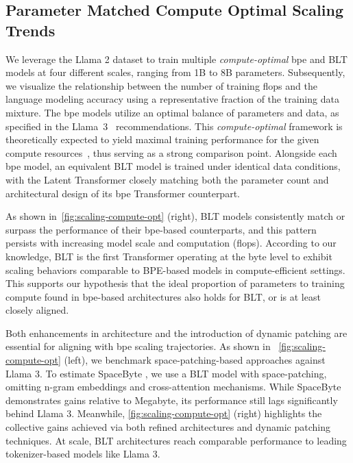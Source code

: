 \subsection{Parameter Matched Compute Optimal Scaling Trends}
\label{section:parameter-matched-scaling}
We leverage the Llama 2 dataset to train multiple \textit{compute-optimal} bpe and {\textsc BLT} models at four different scales, ranging from 1B to 8B parameters. Subsequently, we visualize the relationship between the number of training flops and the language modeling accuracy using a representative fraction of the training data mixture. The bpe models utilize an optimal balance of parameters and data, as specified in the Llama~3~\citep{dubey2024llama} recommendations. This \textit{compute-optimal} framework is theoretically expected to yield maximal training performance for the given compute resources~\citep{hoffmann2022training}, thus serving as a strong comparison point. Alongside each bpe model, an equivalent {\textsc BLT} model is trained under identical data conditions, with the Latent Transformer closely matching both the parameter count and architectural design of its bpe Transformer counterpart.

As shown in~\autoref{fig:scaling-compute-opt} (right), {\textsc BLT} models consistently match or surpass the performance of their bpe-based counterparts, and this pattern persists with increasing model scale and computation (flops). According to our knowledge, {\textsc BLT} is the first Transformer operating at the byte level to exhibit scaling behaviors comparable to BPE-based models in compute-efficient settings. This supports our hypothesis that the ideal proportion of parameters to training compute found in bpe-based architectures also holds for {\textsc BLT}, or is at least closely aligned.

Both enhancements in architecture and the introduction of dynamic patching are essential for aligning with bpe scaling trajectories. As shown in ~\autoref{fig:scaling-compute-opt} (left), we benchmark space-patching-based approaches against Llama 3. To estimate SpaceByte \citep{slagle2024spacebyte}, we use a {\textsc BLT} model with space-patching, omitting n-gram embeddings and cross-attention mechanisms. While SpaceByte demonstrates gains relative to Megabyte, its performance still lags significantly behind Llama 3. Meanwhile, \autoref{fig:scaling-compute-opt} (right) highlights the collective gains achieved via both refined architectures and dynamic patching techniques. At scale, {\textsc BLT} architectures reach comparable performance to leading tokenizer-based models like Llama 3.

